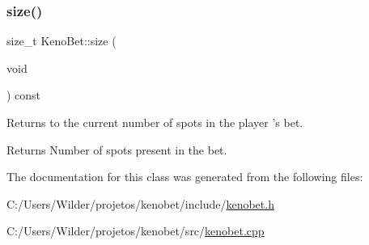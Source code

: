 \subsubsection{\texorpdfstring{size()}{size()}}
{\footnotesize\ttfamily size\+\_\+t Keno\+Bet\+::size (\begin{DoxyParamCaption}\item[{void}]{ }\end{DoxyParamCaption}) const}



Returns to the current number of spots in the player ’s bet. 

\begin{DoxyReturn}{Returns}
Number of spots present in the bet. 
\end{DoxyReturn}


The documentation for this class was generated from the following files\+:\begin{DoxyCompactItemize}
\item 
C\+:/\+Users/\+Wilder/projetos/kenobet/include/\mbox{\hyperlink{kenobet_8h}{kenobet.\+h}}\item 
C\+:/\+Users/\+Wilder/projetos/kenobet/src/\mbox{\hyperlink{kenobet_8cpp}{kenobet.\+cpp}}\end{DoxyCompactItemize}
